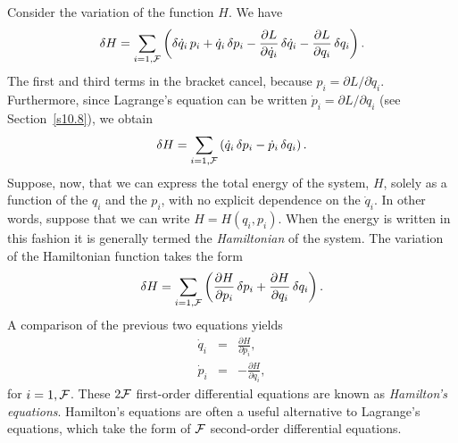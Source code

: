 Consider the variation of the function $H$. We have
\begin{equation}
\delta H = \sum_{i=1,{\cal F}} \left(\delta\dot{q}_i\,p_i + \dot{q}_i\,\delta p_i
- \frac{\partial L}{\partial \dot{q}_i}\,\delta \dot{q}_i - \frac{\partial L}{\partial q_i}\,\delta q_i\right).
\end{equation}
The first and third terms in the bracket cancel, because $p_i=
\partial L/\partial \dot{q}_i$. Furthermore, since Lagrange's equation
can be written $\dot{p}_i = \partial L/\partial q_i$ (see Section~\ref{s10.8}), we obtain
\begin{equation}
\delta H = \sum_{i=1,{\cal F}} \left(\dot{q}_i\,\delta p_i - \dot{p}_i\,\delta q_i\right).
\end{equation}
Suppose, now, that we can express the total energy of the system, $H$, solely
as a function of the $q_i$ and the $p_i$, with no explicit
dependence on the $\dot{q}_i$. In other words, suppose that we
can write $H=H(q_i,p_i)$. When the energy is written
in this fashion it is generally termed the {\em Hamiltonian} of the system. The variation of the Hamiltonian function  takes the form
\begin{equation}
\delta H =\sum_{i=1,{\cal F}} \left(\frac{\partial H}{\partial p_i}\,\delta p_i + 
\frac{\partial H}{\partial q_i}\,\delta{q}_i\right).
\end{equation}
A comparison of the previous two equations yields
\begin{eqnarray}\label{e11.77}
\dot{q}_i &=& \frac{\partial H}{\partial p_i},\\[0.5ex]
\dot{p}_i &=&-\frac{\partial H}{\partial q_i},\label{e11.78}
\end{eqnarray}
for $i=1,{\cal F}$. These $2{\cal F}$ first-order differential equations are known
as {\em Hamilton's equations}. Hamilton's equations are often a
useful alternative to Lagrange's equations, which take the
form of ${\cal F}$ second-order differential equations. 

